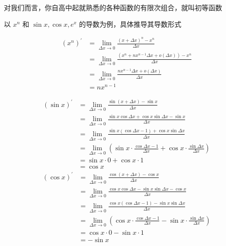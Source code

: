 \documentclass[lang=cn,newtx,10pt,scheme=chinese]{elegantbook}
\begin{document}
对我们而言，你自高中起就熟悉的各种函数的有限次组合，就叫初等函数

以 $x^{n}$ 和 $\sin x,\cos x,e^{x}$ 的导数为例，具体推导其导数形式
\begin{example}
  \begin{equation}
    \begin{aligned}
      (x^{n})^{\prime }&=\lim_{\Delta x \to 0}\frac{(x+\Delta x)^{n}-x^{n}}{\Delta x} \\
      &=\lim_{\Delta x \to 0}\frac{(x^{n}+nx^{n-1}\Delta x+o(\Delta x))-x^{n}}{\Delta x} \\
      &=\lim_{\Delta x \to 0}\frac{nx^{n-1}\Delta x+o(\Delta x)}{\Delta x} \\
      &=nx^{n-1}
    \end{aligned}
  \end{equation}
\end{example}
\begin{example}
  \begin{equation}
    \begin{aligned}
      (\sin x)^{\prime } &= \lim_{\Delta x \to 0} \frac{\sin(x+\Delta x) - \sin x}{\Delta x} \\
      &= \lim_{\Delta x \to 0} \frac{\sin x \cos \Delta x + \cos x \sin \Delta x - \sin x}{\Delta x} \\
      &= \lim_{\Delta x \to 0} \frac{\sin x (\cos \Delta x - 1) + \cos x \sin \Delta x}{\Delta x} \\
      &= \lim_{\Delta x \to 0} \left( \sin x \cdot \frac{\cos \Delta x - 1}{\Delta x} + \cos x \cdot \frac{\sin \Delta x}{\Delta x} \right) \\
      &= \sin x \cdot 0 + \cos x \cdot 1 \\
      &= \cos x
    \end{aligned}
  \end{equation}
  \begin{equation}
    \begin{aligned}
      (\cos x)^{\prime } &= \lim_{\Delta x \to 0} \frac{\cos(x+\Delta x) - \cos x}{\Delta x} \\
      &= \lim_{\Delta x \to 0} \frac{\cos x \cos \Delta x - \sin x \sin \Delta x - \cos x}{\Delta x} \\
      &= \lim_{\Delta x \to 0} \frac{\cos x (\cos \Delta x - 1) - \sin x \sin \Delta x}{\Delta x} \\
      &= \lim_{\Delta x \to 0} \left( \cos x \cdot \frac{\cos \Delta x - 1}{\Delta x} - \sin x \cdot \frac{\sin \Delta x}{\Delta x} \right) \\
      &= \cos x \cdot 0 - \sin x \cdot 1 \\
      &= -\sin x
    \end{aligned}
  \end{equation}
\end{example}
\end{document}
